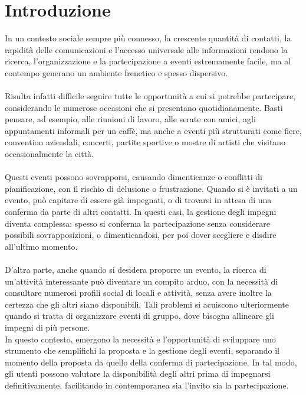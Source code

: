 \chapter*{Introduzione}

In un contesto sociale sempre più connesso, la crescente quantità di contatti, 
la rapidità delle comunicazioni e l'accesso universale alle informazioni 
rendono la ricerca, l'organizzazione e la partecipazione a eventi estremamente facile, 
ma al contempo generano un ambiente frenetico e spesso dispersivo.\\
\\
Risulta infatti difficile seguire tutte le opportunità a cui si potrebbe partecipare, 
considerando le numerose occasioni che si presentano quotidianamente. 
Basti pensare, ad esempio, alle riunioni di lavoro, alle serate con amici, agli appuntamenti informali per un caffè, 
ma anche a eventi più strutturati come fiere, convention aziendali, concerti, partite sportive o
mostre di artisti che visitano occasionalmente la città.\\
\\
Questi eventi possono sovrapporsi, causando dimenticanze o conflitti di pianificazione, 
con il rischio di delusione o frustrazione. 
Quando si è invitati a un evento, può capitare di essere già impegnati, 
o di trovarsi in attesa di una conferma da parte di altri contatti.
In questi casi, la gestione degli impegni diventa complessa: 
spesso si conferma la partecipazione senza considerare possibili sovrapposizioni, o dimenticandosi, 
per poi dover scegliere e disdire all'ultimo momento. \\
\\
D'altra parte, anche quando si desidera proporre un evento, 
la ricerca di un'attività interessante può diventare un compito arduo, 
con la necessità di consultare numerosi profili social di locali e attività,
senza avere inoltre la certezza che gli altri siano disponibili.
Tali problemi si acuiscono ulteriormente quando si tratta di organizzare eventi di gruppo, 
dove bisogna allineare gli impegni di più persone.\\
\clearpage
In questo contesto,
emergono la necessità e l'opportunità di sviluppare uno strumento
che semplifichi la proposta e la gestione degli eventi,
separando il momento della proposta da quello della conferma di partecipazione. 
In tal modo, gli utenti possono valutare la disponibilità degli altri prima di impegnarsi definitivamente, 
facilitando in contemporanea sia l'invito sia la partecipazione.\\ 
